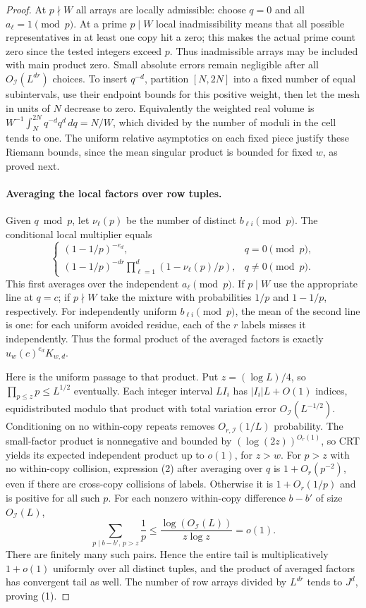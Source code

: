 \documentclass[11pt]{article}
\newcommand{\1}{\mathbf{1}}
\begin{document}
\begin{proof}
\par At $p\nmid W$ all arrays are locally admissible: choose $q=0$ and all $a_\ell=1\pmod p$. At a prime $p\mid W$ local inadmissibility means that all possible representatives in at least one copy hit a zero; this makes the actual prime count zero since the tested integers exceed $p$. Thus inadmissible arrays may be included with main product zero. Small absolute errors remain negligible after all $O_{\mathcal I}(L^{dr})$ choices. To insert $q^{-d}$, partition $[N,2N]$ into a fixed number of equal subintervals, use their endpoint bounds for this positive weight, then let the mesh in units of $N$ decrease to zero. Equivalently the weighted real volume is $W^{-1}\int_N^{2N}q^{-d}q^d\,dq=N/W$, which divided by the number of moduli in the cell tends to one. The uniform relative asymptotics on each fixed piece justify these Riemann bounds, since the mean singular product is bounded for fixed $w$, as proved next.

\paragraph{Averaging the local factors over row tuples.}
Given $q\bmod p$, let $\nu_\ell(p)$ be the number of distinct $b_{\ell i}\pmod p$. The conditional local multiplier equals
\[
 \begin{cases}
 (1-1/p)^{-e_d},&q=0\pmod p,\\
 (1-1/p)^{-dr}\prod_{\ell=1}^d(1-\nu_\ell(p)/p),&q\ne0\pmod p .
 \end{cases}\tag{2}
\]
This first averages over the independent $a_\ell\pmod p$. If $p\mid W$ use the appropriate line at $q=c$; if $p\nmid W$ take the mixture with probabilities $1/p$ and $1-1/p$, respectively. For independently uniform $b_{\ell i}\pmod p$, the mean of the second line is one: for each uniform avoided residue, each of the $r$ labels misses it independently. Thus the formal product of the averaged factors is exactly $u_w(c)^{e_d}K_{w,d}$.

Here is the uniform passage to that product. Put $z=(\log L)/4$, so $\prod_{p\le z}p\le L^{1/2}$ eventually. Each integer interval $LI_i$ has $|I_i|L+O(1)$ indices, equidistributed modulo that product with total variation error $O_{\mathcal I}(L^{-1/2})$. Conditioning on no within-copy repeats removes $O_{r,\mathcal I}(1/L)$ probability. The small-factor product is nonnegative and bounded by $(\log(2z))^{O_r(1)}$, so CRT yields its expected independent product up to $o(1)$, for $z>w$. For $p>z$ with no within-copy collision, expression (2) after averaging over $q$ is $1+O_r(p^{-2})$, even if there are cross-copy collisions of labels. Otherwise it is $1+O_r(1/p)$ and is positive for all such $p$. For each nonzero within-copy difference $b-b'$ of size $O_{\mathcal I}(L)$,
\[
 \sum_{p\mid b-b',\,p>z}\frac1p\le\frac{\log(O_{\mathcal I}(L))}{z\log z}=o(1).
\]
There are finitely many such pairs. Hence the entire tail is multiplicatively $1+o(1)$ uniformly over all distinct tuples, and the product of averaged factors has convergent tail as well. The number of row arrays divided by $L^{dr}$ tends to $J^d$, proving (1).


\end{proof}
\end{document}
